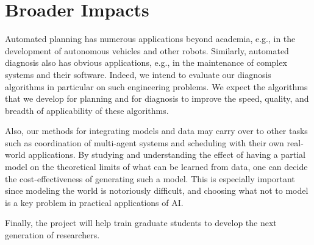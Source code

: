 \documentclass[12pt]{article}
\begin{document}


\section{Broader Impacts}
Automated planning has numerous applications beyond academia, e.g., in the development of autonomous vehicles and other robots. Similarly, automated diagnosis also has obvious applications, e.g., in the maintenance of complex systems and their software. Indeed, we intend to evaluate our diagnosis algorithms in particular on such engineering problems. %
We expect the algorithms that we develop for planning and for diagnosis to improve the speed, quality, and breadth of applicability of these algorithms. 


Also, our methods for integrating models and data may carry over to other tasks such as coordination of multi-agent systems and scheduling with their own real-world applications. By studying and understanding the effect of having a partial model on the theoretical limits of what can be learned from data, one can decide the cost-effectiveness of generating such a model. 
This is especially important since modeling the world is notoriously difficult, and choosing what not to model is a key problem in practical applications of AI. 

Finally, the project will help train graduate students to develop the next generation of researchers. 
\end{document}
